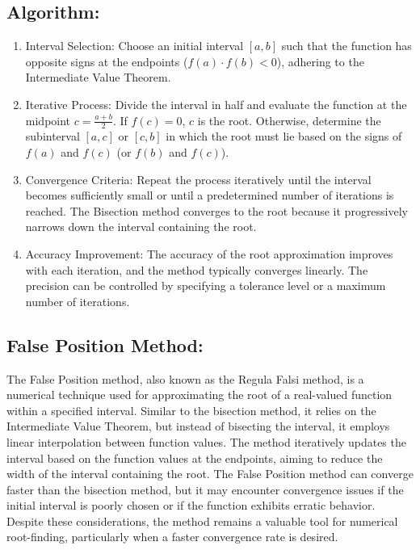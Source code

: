 \documentclass[a4paper,12pt]{report}
\begin{document}
\subsection*{Algorithm:}
\begin{enumerate}
    \item Interval Selection: Choose an initial interval $[a, b]$ such that the function has opposite signs at the endpoints ($f(a) \cdot f(b) < 0$), adhering to the Intermediate Value Theorem.
    \item Iterative Process: Divide the interval in half and evaluate the function at the midpoint $c = \frac{a+b}{2}$. If $f(c) = 0$, $c$ is the root. Otherwise, determine the subinterval $[a, c]$ or $[c, b]$ in which the root must lie based on the signs of $f(a)$ and $f(c)$ (or $f(b)$ and $f(c)$).
    \item Convergence Criteria: Repeat the process iteratively until the interval becomes sufficiently small or until a predetermined number of iterations is reached. The Bisection method converges to the root because it progressively narrows down the interval containing the root.
    \item Accuracy Improvement: The accuracy of the root approximation improves with each iteration, and the method typically converges linearly. The precision can be controlled by specifying a tolerance level or a maximum number of iterations.
\end{enumerate}

\subsection*{False Position Method:}
\qquad The False Position method, also known as the Regula Falsi method, is a numerical technique used for approximating the root of a real-valued function within a specified interval. Similar to the bisection method, it relies on the Intermediate Value Theorem, but instead of bisecting the interval, it employs linear interpolation between function values. The method iteratively updates the interval based on the function values at the endpoints, aiming to reduce the width of the interval containing the root. The False Position method can converge faster than the bisection method, but it may encounter convergence issues if the initial interval is poorly chosen or if the function exhibits erratic behavior. Despite these considerations, the method remains a valuable tool for numerical root-finding, particularly when a faster convergence rate is desired.
\end{document}
